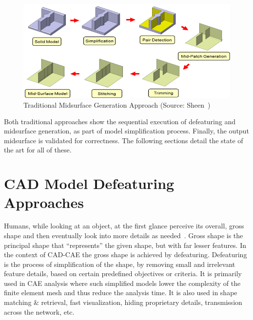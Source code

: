 
	\begin{figure} [!h]
		\centering
		\includegraphics[width=0.9\linewidth]{..//Common/images/MidsurfaceProposedApproach}
		\caption{Traditional Midsurface Generation Approach (Source: Sheen~\cite{Sheen2005})}
		\label{fig:introduction:tradmidsurfgen}
	\end{figure} 


Both traditional approaches show the sequential execution of defeaturing and midsurface generation, as part of model simplification process. Finally, the output midsurface is validated for correctness. The following sections detail the state of the art for all of these.

\section{CAD Model Defeaturing Approaches} \label{sec:survey:defeat}

Humans, while looking at an object, at the first glance perceive its overall, gross shape and then eventually look into more details as needed~\cite{LeeLee1998}. Gross shape is the principal shape that ``represents'' the given shape, but with far lesser features. In the context of CAD-CAE the gross shape is achieved by defeaturing. Defeaturing is the process of simplification of the shape, by removing small and irrelevant feature details,  based on certain predefined objectives or criteria. It is primarily used in CAE analysis where such simplified models lower the complexity of the finite element mesh and thus reduce the analysis time. It is also used in shape matching \& retrieval, fast visualization, hiding proprietary details, transmission across the network, etc. 


	
